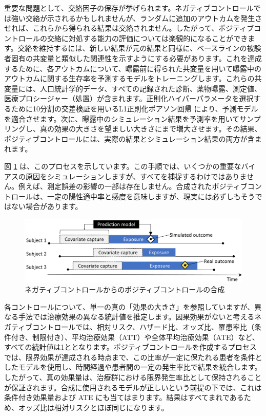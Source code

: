 \documentclass[
  11pt]{book}
\theoremstyle{definition}
\theoremstyle{definition}
\theoremstyle{definition}
\theoremstyle{definition}
\theoremstyle{remark}
\begin{document}
重要な問題として、交絡因子の保存が挙げられます。ネガティブコントロールでは強い交絡が示されるかもしれませんが、ランダムに追加のアウトカムを発生させれば、これらから得られる結果は交絡されません。したがって、ポジティブコントロールの交絡に対処する能力の評価については楽観的になることができます。交絡を維持するには、新しい結果が元の結果と同様に、ベースラインの被験者固有の共変量と類似した関連性を示すようにする必要があります。これを達成するために、各アウトカムについて、曝露前に得られた共変量を用いて曝露中のアウトカムに関する生存率を予測するモデルをトレーニングします。これらの共変量には、人口統計学的データ、すべての記録された診断、薬物曝露、測定値、医療プロシージャー（処置）が含まれます。正則化ハイパーパラメータを選択するために10分割の交差検証を用いるL1正則化ポアソン回帰 \citep{suchard_2013} により、予測モデルを適合させます。次に、曝露中のシミュレーション結果を予測率を用いてサンプリングし、真の効果の大きさを望ましい大きさにまで増大させます。その結果、ポジティブコントロールには、実際の結果とシミュレーション結果の両方が含まれます。

図 \ref{fig:posControlSynth} は、このプロセスを示しています。この手順では、いくつかの重要なバイアスの原因をシミュレーションしますが、すべてを捕捉するわけではありません。例えば、測定誤差の影響の一部は存在しません。合成されたポジティブコントロールは、一定の陽性適中率と感度を意味しますが、現実には必ずしもそうではない場合があります。

\begin{figure}

{\centering \includegraphics[width=0.9\linewidth]{images/MethodValidity/posControlSynth} 

}

\caption{ネガティブコントロールからのポジティブコントロールの合成}\label{fig:posControlSynth}
\end{figure}

各コントロールについて、単一の真の「効果の大きさ」を参照していますが、異なる手法では治療効果の異なる統計値を推定します。因果効果がないと考えるネガティブコントロールでは、相対リスク、ハザード比、オッズ比、罹患率比（条件付き、制限付き）、平均治療効果（ATT）や全体平均治療効果（ATE）など、すべての統計値は1ととなります。ポジティブコントロールを作成するプロセスでは、限界効果が達成される時点まで、この比率が一定に保たれる患者を条件としたモデルを使用し、時間経過や患者間の一定の発生率比で結果を統合します。したがって、真の効果量は、治療群における限界発生率比として保持されることが保証されます。合成に使用されるモデルが正しいという前提の下では、これは条件付き効果量および ATE にも当てはまります。結果はすべてまれであるため、オッズ比は相対リスクとほぼ同じになります。
\end{document}

